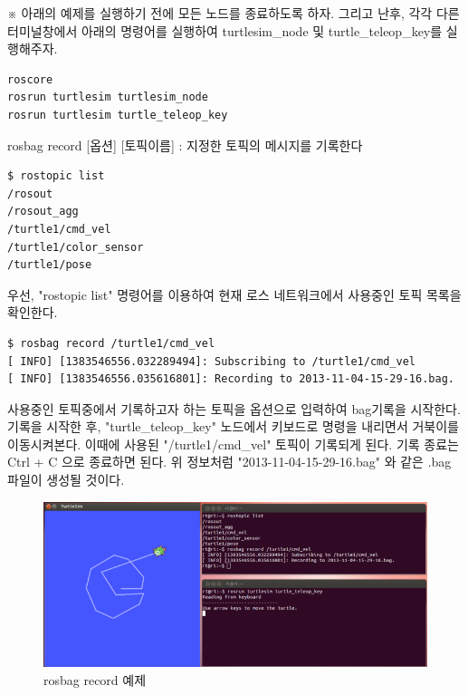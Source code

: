 \vspace{\baselineskip}
\noindent
※ 아래의 예제를 실행하기 전에 모든 노드를 종료하도록 하자. 그리고 난후, 각각 다른 터미널창에서 아래의 명령어를 실행하여 turtlesim\_node 및 turtle\_teleop\_key를 실행해주자.

\begin{lstlisting}[language=ROS]
roscore
rosrun turtlesim turtlesim_node 
rosrun turtlesim turtle_teleop_key
\end{lstlisting}

\setcounter{num}{0}

\vspace{\baselineskip}
\noindent
{}\circled{\thenum} rosbag record [옵션] [토픽이름] : 지정한 토픽의 메시지를 기록한다

\begin{lstlisting}[language=ROS]
$ rostopic list
/rosout
/rosout_agg
/turtle1/cmd_vel
/turtle1/color_sensor
/turtle1/pose
\end{lstlisting}

\noindent
우선, "rostopic list" 명령어를 이용하여 현재 로스 네트워크에서 사용중인 토픽 목록을 확인한다.

\begin{lstlisting}[language=ROS]
$ rosbag record /turtle1/cmd_vel
[ INFO] [1383546556.032289494]: Subscribing to /turtle1/cmd_vel
[ INFO] [1383546556.035616801]: Recording to 2013-11-04-15-29-16.bag.
\end{lstlisting}

\noindent
사용중인 토픽중에서 기록하고자 하는 토픽을 옵션으로 입력하여 bag기록을 시작한다. 기록을 시작한 후, "turtle\_teleop\_key" 노드에서 키보드로 명령을 내리면서 거북이를 이동시켜본다. 이때에 사용된 "/turtle1/cmd\_vel" 토픽이 기록되게 된다. 기록 종료는 Ctrl + C 으로 종료하면 된다. 위 정보처럼 "2013-11-04-15-29-16.bag" 와 같은 .bag 파일이 생성될 것이다.

\begin{figure}[h]
\centering\includegraphics[width=0.8\columnwidth]{pictures/chapter5/rosbag_record.png}
\caption{rosbag record 예제}
\end{figure}


